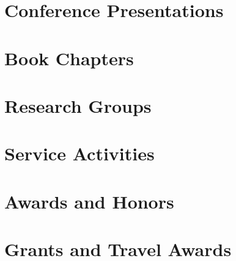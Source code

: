 \documentclass[letterpaper,11pt]{article}
\begin{document}


\section{Conference Presentations}





\section{Book Chapters}




\nocite{*}


\section{Research Groups}



\section{Service Activities}



\section{Awards and Honors}



\section{Grants and Travel Awards}


\end{document}
